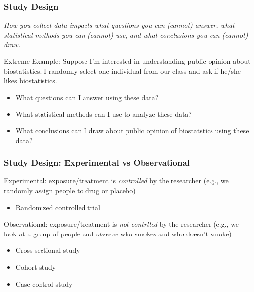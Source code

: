 \documentclass[12pt, 
hyperref={colorlinks=true, linkcolor=blue, urlcolor=cyan}]{beamer}
\begin{document}
\begin{frame}
\frametitle{Study Design}
\textit{How you collect data impacts what questions you can (cannot) answer, what statistical methods you can (cannot) use, and what conclusions you can (cannot) draw.}

\color{blue} Extreme Example: \color{black} Suppose I'm interested in understanding public opinion about biostatistics. I  randomly select one individual from our class and ask if he/she likes biostatistics. \vspace{-0.3cm}

\begin{itemize} %
\item What questions can I answer using these data? 
\item What statistical methods can I use to analyze these data? 
\item What conclusions can I draw about public opinion of biostatstics using these data? 
\end{itemize} 

\end{frame}

\begin{frame}
\frametitle{Study Design: Experimental vs Observational}

\color{blue} Experimental: \color{black} exposure/treatment is \textit{controlled} by the researcher (e.g., we randomly assign people to drug or placebo) \vspace{-0.3cm}
	\begin{itemize}
	\item Randomized controlled trial %
	\end{itemize}

\color{blue} Observational: \color{black} exposure/treatment is \textit{not contrlled} by the researcher (e.g., we look at a group of people and \textit{observe} who smokes and who doesn't smoke)  \vspace{-0.3cm}
	\begin{itemize}
	\item Cross-sectional study
	\item Cohort study
	\item Case-control study
	\end{itemize}
\end{frame}
\end{document}
